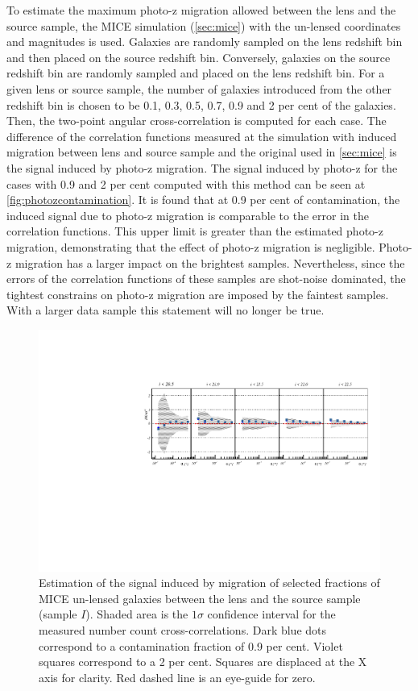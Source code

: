 To estimate the maximum photo-z migration allowed between the lens and the source sample, the MICE simulation (\autoref{sec:mice}) with the un-lensed coordinates and magnitudes is used. Galaxies are randomly sampled on the lens redshift bin and then placed on the source redshift bin. Conversely, galaxies on the source redshift bin are randomly sampled and placed on the lens redshift bin. For a given lens or source sample, the number of galaxies introduced from the other redshift bin is chosen to be 0.1, 0.3, 0.5, 0.7, 0.9 and 2 per cent of the galaxies. Then, the two-point angular cross-correlation is computed for each case. The difference of the correlation functions measured at the simulation with induced migration between lens and source sample and the original used in \autoref{sec:mice} is the signal induced by photo-z migration. The signal induced by photo-z for the cases with 0.9 and 2 per cent computed with this method can be seen at \autoref{fig:photozcontamination}. It is found that  at 0.9 per cent of contamination, the induced signal due to photo-z migration is comparable to the error in the correlation functions. This upper limit is greater than the estimated photo-z migration, demonstrating that the effect of photo-z migration is negligible. Photo-z migration has a larger impact on the brightest samples. Nevertheless, since the errors of the correlation functions of these samples are shot-noise dominated, the tightest constrains on photo-z migration are imposed by the faintest samples. With a larger data sample this statement will no longer be true.
\begin{figure}
\includegraphics[width=\textwidth,trim={0 2.3cm 0 3.5cm},clip]{./figures/mag_i_mix.pdf}
\caption{Estimation of the signal induced by migration of selected fractions of MICE un-lensed galaxies between the lens and the source sample (sample $I$). Shaded area is the $1\sigma$ confidence interval for the measured number count cross-correlations. Dark blue dots correspond to a contamination fraction of 0.9 per cent. Violet squares correspond to a 2 per cent. Squares are displaced at the X axis for clarity. Red dashed line is an eye-guide for zero.}
\label{fig:photozcontamination}
\end{figure}
\newline

